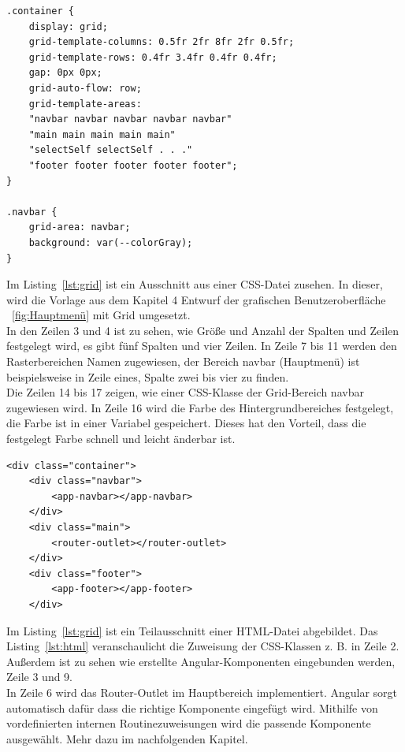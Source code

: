 \lstset{language=html}
\begin{lstlisting}[frame=tb, caption={Umsetzung des Grid-Layout}, label={lst:grid}]
.container {
	display: grid;
	grid-template-columns: 0.5fr 2fr 8fr 2fr 0.5fr;
	grid-template-rows: 0.4fr 3.4fr 0.4fr 0.4fr;
	gap: 0px 0px;
	grid-auto-flow: row;
	grid-template-areas:
	"navbar navbar navbar navbar navbar"
	"main main main main main"
	"selectSelf selectSelf . . ."
	"footer footer footer footer footer";
}

.navbar {
	grid-area: navbar;
	background: var(--colorGray);
}
	\end{lstlisting}


Im Listing~\ref{lst:grid} ist ein Ausschnitt aus einer CSS-Datei zusehen. In dieser, wird die Vorlage aus dem Kapitel 4 Entwurf der grafischen Benutzeroberfläche ~\ref{fig:Hauptmenü} mit Grid umgesetzt.
\\
In den Zeilen 3 und 4 ist zu sehen, wie Größe und Anzahl der Spalten und Zeilen festgelegt wird, es gibt fünf Spalten und vier Zeilen. In Zeile 7 bis 11 werden den Rasterbereichen Namen zugewiesen, der Bereich navbar (Hauptmenü) ist beispielsweise in Zeile eines, Spalte zwei bis vier zu finden.
 \\
Die Zeilen 14 bis 17 zeigen, wie einer CSS-Klasse der Grid-Bereich navbar zugewiesen wird. In Zeile 16 wird die Farbe des Hintergrundbereiches festgelegt, die Farbe ist in einer Variabel gespeichert. Dieses hat den Vorteil, dass die festgelegt Farbe schnell und leicht änderbar ist.
\\


\lstset{language=html}
\begin{lstlisting}[frame=tb, caption={Zuweisung der Komponenten in HTML}, label={lst:html}]
<div class="container">
	<div class="navbar">
		<app-navbar></app-navbar>
	</div>
	<div class="main">
		<router-outlet></router-outlet>
	</div>
	<div class="footer">
		<app-footer></app-footer>
	</div>
\end{lstlisting}

Im Listing~\ref{lst:grid} ist ein Teilausschnitt einer HTML-Datei abgebildet.
Das Listing~\ref{lst:html} veranschaulicht die Zuweisung der CSS-Klassen z. B. in Zeile 2.
\\
Außerdem ist zu sehen wie erstellte Angular-Komponenten eingebunden werden, Zeile 3 und 9.
\\
In Zeile 6 wird das Router-Outlet im Hauptbereich implementiert. Angular sorgt automatisch dafür dass die richtige Komponente eingefügt wird. Mithilfe von vordefinierten internen Routinezuweisungen wird die passende Komponente ausgewählt. Mehr dazu im nachfolgenden Kapitel.
\\

